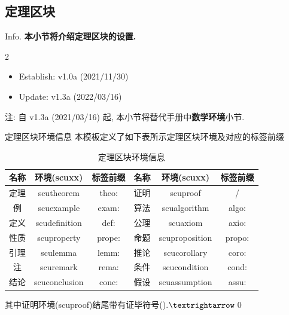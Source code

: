 \subsection{定理区块}
\begin{frame}{Info.}
	\textbf{本小节将介绍定理区块的设置.}
	\begin{multicols}{2}
		\begin{itemize}
			\item Establish: \textcolor{scugreen}{v1.0a (2021/11/30)}
			\item Update: \textcolor{scugreen}{v1.3a (2022/03/16)}
		\end{itemize}
	\end{multicols}
	注: 自 \textcolor{scugreen}{v1.3a (2021/03/16)} 起, 本小节将替代手册中\alert{\bfseries 数学环境}小节.\par
	\mycopyright
\end{frame}

\begin{frame}{定理区块环境信息}
	本模板定义了如下表所示定理区块环境及对应的标签前缀
	\begin{table}[htbp!]
		\centering
		\caption{定理区块环境信息}
		\label{tab:ShuxueHjdy}
		\begin{tabular}{ccc|ccc}
			\toprule
			名称 &          环境(scuxx)        &  标签前缀  & 名称 &          环境(scuxx)         &  标签前缀  \\ \midrule
			定理 &  \color{scured}scutheorem   &  theo:     & 证明 &    \color{scured}scuproof    &   /     \\
			例   &  \color{scured}scuexample   &  exam:     & 算法 &  \color{scured}scualgorithm  &  algo:  \\
			定义 & \color{scured}scudefinition &  def:      & 公理 &    \color{scured}scuaxiom    &  axio:  \\
			性质 &  \color{scured}scuproperty  &  prope:    & 命题 & \color{scured}scuproposition &  propo: \\
			引理 &   \color{scured}sculemma    &  lemm:     & 推论 &  \color{scured}scucorollary  &  coro:  \\
			注   &   \color{scured}scuremark   &  rema:     & 条件 &  \color{scured}scucondition  &  cond:  \\
			结论 & \color{scured}scuconclusion &  conc:     & 假设 & \color{scured}scuassumption  &  assu:  \\ \bottomrule
		\end{tabular}
	\end{table}
	其中证明环境(scuproof)结尾带有证毕符号().$\textrightarrow$\qed
\end{frame}

